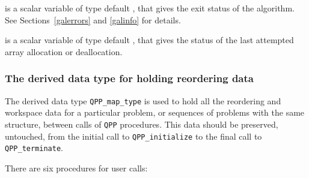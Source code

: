 \documentclass{galahad}
\newcommand{\packagename}{QPP}
\begin{document}
\begin{description}

 is a scalar variable of type default \integer, that gives the
exit status of the algorithm. See Sections~\ref{galerrors} and \ref{galinfo}
for details.

 is a scalar variable of type default \integer, that gives
the status of the last attempted array allocation or deallocation.

\end{description}


\subsubsection{The derived data type for holding reordering data}\label{typemap}
The derived data type 
{\tt \packagename\_map\_type} 
is used to hold all the reordering and workspace data for a particular 
problem, or sequences of problems with the same structure, between calls of 
{\tt \packagename} procedures. 
This data should be preserved, untouched, from the initial call to 
{\tt \packagename\_initialize}
to the final call to
{\tt \packagename\_terminate}.


\galarguments
There are six procedures for user calls:
\end{document}
